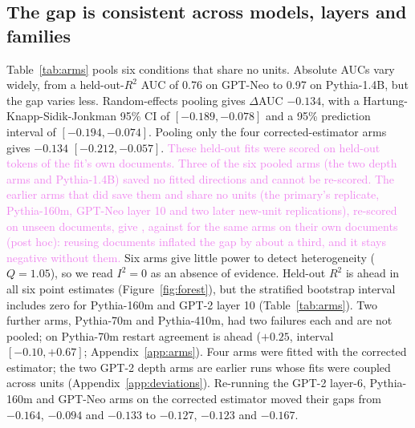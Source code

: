\documentclass[10pt]{article}
\newcommand{\draft}[1]{\textcolor{violet}{#1}}
\begin{document}
\subsection{The gap is consistent across models, layers and families}
Table~\ref{tab:arms} pools six conditions that share no units. Absolute AUCs vary widely,
from a held-out-$R^2$ AUC of 0.76 on GPT-Neo to 0.97 on Pythia-1.4B, but the gap varies
less. Random-effects pooling gives $\Delta$AUC $-0.134$, with a Hartung-Knapp-Sidik-Jonkman
95\% CI of $[-0.189,-0.078]$ and a 95\% prediction interval of $[-0.194,-0.074]$. Pooling only
the four corrected-estimator arms gives $-0.134$ $[-0.212,-0.057]$. \draft{These held-out fits were
scored on held-out tokens of the fit's own documents. Three of the six pooled arms (the two depth
arms and Pythia-1.4B) saved no fitted directions and cannot be re-scored. The \poolK{} earlier arms
that did save them and share no units (the primary's replicate, Pythia-160m, GPT-Neo layer 10 and two
later new-unit replications), re-scored on unseen documents, give \poolTest{} \poolTestCI, against
\poolHeld{} \poolHeldCI{} for the same arms on their own documents (post hoc): reusing documents
inflated the gap by about a third, and it stays negative without them.} Six arms give little power
to detect heterogeneity ($Q = 1.05$), so we read $I^2 = 0$ as an absence of evidence. Held-out
$R^2$ is ahead in all six point estimates (Figure~\ref{fig:forest}), but the stratified
bootstrap interval includes zero for Pythia-160m and GPT-2 layer 10 (Table~\ref{tab:arms}).
Two further arms, Pythia-70m and Pythia-410m, had two failures each and are not pooled; on
Pythia-70m restart agreement is ahead ($+0.25$, interval $[-0.10, +0.67]$;
Appendix~\ref{app:arms}). Four arms
were fitted with the corrected estimator; the two GPT-2 depth arms are earlier runs whose fits
were coupled across units (Appendix~\ref{app:deviations}). Re-running the GPT-2 layer-6,
Pythia-160m and GPT-Neo arms on the corrected estimator moved their gaps from $-0.164$,
$-0.094$ and $-0.133$ to $-0.127$, $-0.123$ and $-0.167$.
\end{document}
